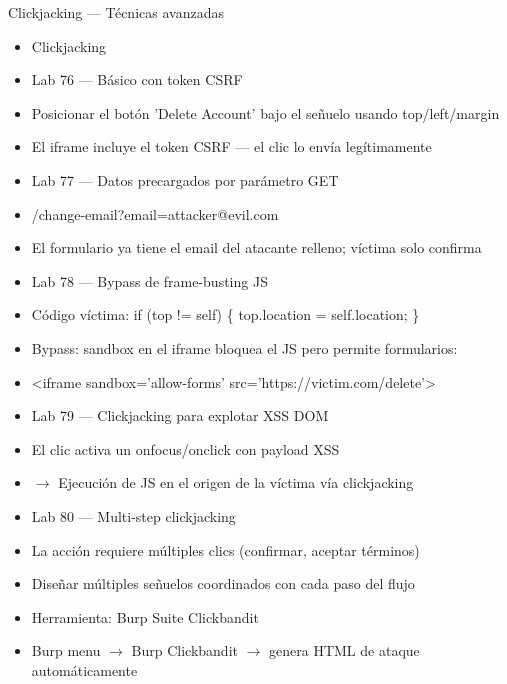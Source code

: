 \documentclass[aspectratio=169,10pt]{beamer}
\newcommand{\cmdbox}[1]{%
  \begin{center}%
  {\setlength{\fboxsep}{6pt}\colorbox{uzlav!40}{\parbox{0.88\linewidth}{\ttfamily\footnotesize #1}}}%
  \end{center}}
\begin{document}
\begin{frame}[allowframebreaks]{Clickjacking --- Técnicas avanzadas}
\small
  \begin{itemize}
  \item Clickjacking
  \item Lab 76 --- Básico con token CSRF
  \item Posicionar el botón 'Delete Account' bajo el señuelo usando top/left/margin
  \item El iframe incluye el token CSRF --- el clic lo envía legítimamente
  \item Lab 77 --- Datos precargados por parámetro GET
  \item[] \cmdbox{/change-email?email=attacker@evil.com}
  \item El formulario ya tiene el email del atacante relleno; víctima solo confirma
  \item Lab 78 --- Bypass de frame-busting JS
  \item Código víctima: if (top != self) \{ top.location = self.location; \}
  \item Bypass: sandbox en el iframe bloquea el JS pero permite formularios:
  \item[] \cmdbox{\textless{}iframe sandbox='allow-forms' src='https://victim.com/delete'\textgreater{}}
  \item Lab 79 --- Clickjacking para explotar XSS DOM
  \item El clic activa un onfocus/onclick con payload XSS
  \item $\rightarrow$ Ejecución de JS en el origen de la víctima vía clickjacking
  \item Lab 80 --- Multi-step clickjacking
  \item La acción requiere múltiples clics (confirmar, aceptar términos)
  \item Diseñar múltiples señuelos coordinados con cada paso del flujo
  \item Herramienta: Burp Suite Clickbandit
  \item Burp menu $\rightarrow$ Burp Clickbandit $\rightarrow$ genera HTML de ataque automáticamente
  \end{itemize}
\end{frame}
\end{document}
